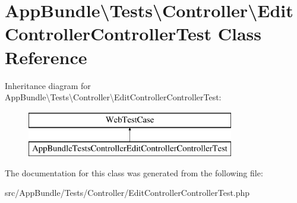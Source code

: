 \hypertarget{class_app_bundle_1_1_tests_1_1_controller_1_1_edit_controller_controller_test}{}\section{App\+Bundle\textbackslash{}Tests\textbackslash{}Controller\textbackslash{}Edit\+Controller\+Controller\+Test Class Reference}
\label{class_app_bundle_1_1_tests_1_1_controller_1_1_edit_controller_controller_test}
Inheritance diagram for App\+Bundle\textbackslash{}Tests\textbackslash{}Controller\textbackslash{}Edit\+Controller\+Controller\+Test\+:\begin{figure}[H]
\begin{center}
\leavevmode
\includegraphics[height=2.000000cm]{class_app_bundle_1_1_tests_1_1_controller_1_1_edit_controller_controller_test}
\end{center}
\end{figure}


The documentation for this class was generated from the following file\+:\begin{DoxyCompactItemize}
\item 
src/\+App\+Bundle/\+Tests/\+Controller/Edit\+Controller\+Controller\+Test.\+php\end{DoxyCompactItemize}
